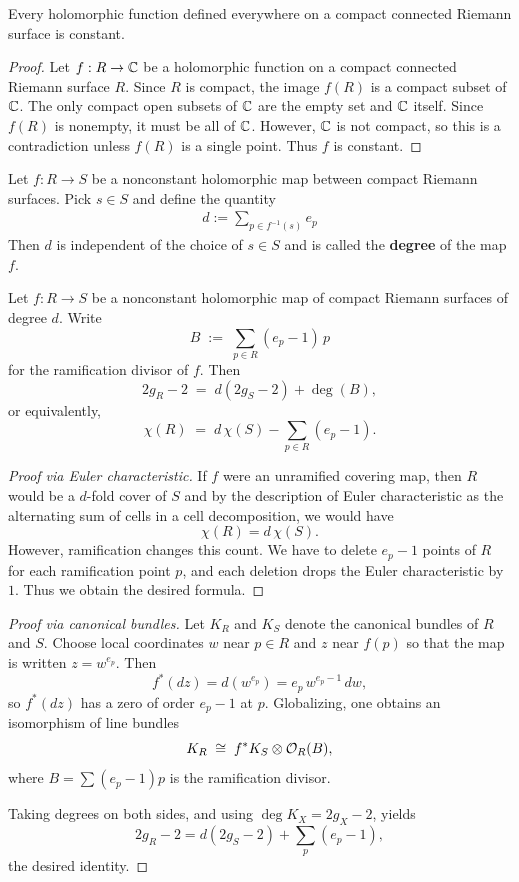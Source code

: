 \documentclass[12pt]{article}
\begin{document}
\begin{corollary}
    Every holomorphic function defined everywhere on a compact connected Riemann surface is constant.
\end{corollary}

\begin{proof}
Let $f : R \to \mathbb{C}$ be a holomorphic function on a compact connected Riemann surface $R$. Since $R$ is compact, the image $f(R)$ is a compact subset of $\mathbb{C}$. The only compact open subsets of $\mathbb{C}$ are the empty set and $\mathbb{C}$ itself. Since $f(R)$ is nonempty, it must be all of $\mathbb{C}$. However, $\mathbb{C}$ is not compact, so this is a contradiction unless $f(R)$ is a single point. Thus $f$ is constant.
\end{proof}

\begin{theorem}
Let $f : R \to S$ be a nonconstant holomorphic map between compact Riemann surfaces. Pick $s\in S$ and define the quantity \begin{align*}
    d := \sum_{p \in f^{-1}(s)} e_p
\end{align*}
Then $d$ is independent of the choice of $s \in S$ and is called the \textbf{degree} of the map $f$.
\end{theorem}

\begin{theorem}
Let $f : R \to S$ be a nonconstant holomorphic map of compact Riemann
surfaces of degree $d$.  Write
\[
B \;:=\; \sum_{p\in R} (e_p - 1)\,p
\]
for the ramification divisor of $f$. Then
\[
2g_R - 2 \;=\; d(2g_S - 2) + \deg(B),
\]
or equivalently,
\[
\chi(R) \;=\; d\,\chi(S) - \sum_{p\in R}(e_p - 1).
\]
\end{theorem}

\begin{proof}[Proof via Euler characteristic]
If $f$ were an unramified covering map, then $R$ would be a $d$-fold cover of $S$ and by the description of Euler characteristic as the alternating sum of cells in a cell decomposition, we would have
\[
\chi(R) = d\,\chi(S).
\]
However, ramification changes this count. We have to delete $e_p - 1$ points of $R$ for each ramification point $p$, and each deletion drops the Euler characteristic by $1$. Thus we obtain the desired formula.
\end{proof}

\begin{proof}[Proof via canonical bundles]
Let $K_R$ and $K_S$ denote the canonical bundles of $R$ and $S$.
Choose local coordinates $w$ near $p\in R$ and $z$ near $f(p)$ so that
the map is written $z = w^{e_p}$.  Then
\[
f^*(dz) = d(w^{e_p})
        = e_p \, w^{e_p-1}\,dw,
\]
so $f^*(dz)$ has a zero of order $e_p - 1$ at $p$.
Globalizing, one obtains an isomorphism of line bundles
\[
K_R \;\cong\; f^*K_S \otimes {\mathcal{O}}_R(B),
\]
where $B = \sum (e_p-1)p$ is the ramification divisor.

Taking degrees on both sides, and using $\deg K_X = 2g_X - 2$, yields
\[
2g_R - 2
= d(2g_S - 2) + \sum_{p}(e_p - 1),
\]
the desired identity.
\end{proof}
\end{document}
